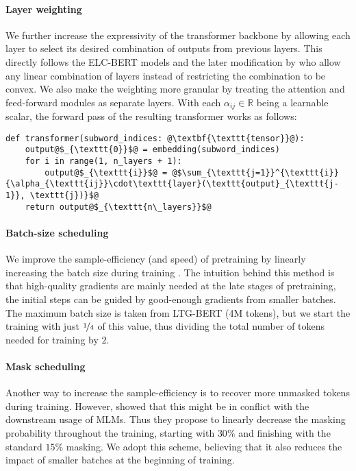 \paragraph{Layer weighting} We further increase the expressivity of the transformer backbone by allowing each layer to select its desired combination of outputs from previous layers. This directly follows the ELC-BERT models \citep{georges-gabriel-charpentier-samuel-2023-layers} and the later modification by  who allow any linear combination of layers instead of restricting the combination to be convex. We also make the weighting more granular by treating the attention and feed-forward modules as separate layers. With each $\alpha_{ij} \in \mathbb{R}$ being a learnable scalar, the forward pass of the resulting transformer works as follows:

\begin{verbatim}
def transformer(subword_indices: @\textbf{\texttt{tensor}}@):
    output@$_{\texttt{0}}$@ = embedding(subword_indices)
    for i in range(1, n_layers + 1):
        output@$_{\texttt{i}}$@ = @$\sum_{\texttt{j=1}}^{\texttt{i}}{\alpha_{\texttt{ij}}\cdot\texttt{layer}(\texttt{output}_{\texttt{j-1}}, \texttt{j})}$@
    return output@$_{\texttt{n\_layers}}$@ 
\end{verbatim}

\paragraph{Batch-size scheduling} We improve the sample-efficiency (and speed) of pretraining by linearly increasing the batch size during training \citep{rae2022scalinglanguagemodelsmethods, deepseekv2}. The intuition behind this method is that high-quality gradients are mainly needed at the late stages of pretraining, the initial steps can be guided by good-enough gradients from smaller batches. The maximum batch size is taken from LTG-BERT (4M tokens), but we start the training with just $\nicefrac{1}{4}$ of this value, thus dividing the total number of tokens needed for training by $2$.

\paragraph{Mask scheduling} Another way to increase the sample-efficiency is to recover more unmasked tokens during training. However,  showed that this might be in conflict with the downstream usage of MLMs. Thus they propose to linearly decrease the masking probability throughout the training, starting with $30\%$ and finishing with the standard $15\%$ masking. We adopt this scheme, believing that it also reduces the impact of smaller batches at the beginning of training. 

